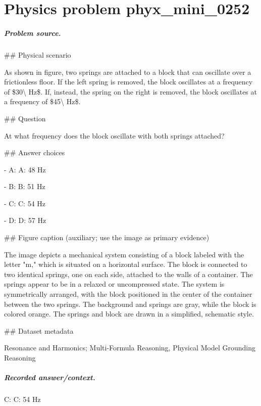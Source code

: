 
\chapter{Physics problem phyx\_mini\_0252}
\label{ch:PhyXMiniProblems_problem_phyx_mini_0252}

\paragraph{Problem source.}
\#\# Physical scenario

As shown in figure, two springs are attached to a block that can oscillate over a frictionless floor. If the left spring is removed, the block oscillates at a frequency of \$30\textbackslash{} Hz\$. If, instead, the spring on the right is removed, the block oscillates at a frequency of \$45\textbackslash{} Hz\$.

\#\# Question

At what frequency does the block oscillate with both springs attached?

\#\# Answer choices

- A: A: 48 Hz

- B: B: 51 Hz

- C: C: 54 Hz

- D: D: 57 Hz

\#\# Figure caption (auxiliary; use the image as primary evidence)

The image depicts a mechanical system consisting of a block labeled with the letter "m," which is situated on a horizontal surface. The block is connected to two identical springs, one on each side, attached to the walls of a container. The springs appear to be in a relaxed or uncompressed state. The system is symmetrically arranged, with the block positioned in the center of the container between the two springs. The background and springs are gray, while the block is colored orange. The springs and block are drawn in a simplified, schematic style.

\#\# Dataset metadata

Resonance and Harmonics; Multi-Formula Reasoning, Physical Model Grounding Reasoning

\paragraph{Recorded answer/context.}
C: C: 54 Hz


